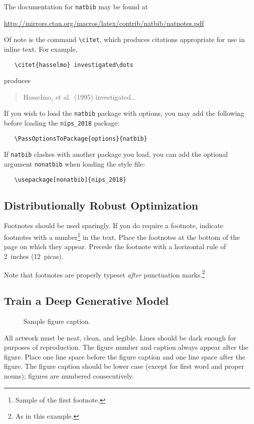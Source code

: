 \documentclass{article}
\begin{document}
The documentation for \verb+natbib+ may be found at
\begin{center}
  \url{http://mirrors.ctan.org/macros/latex/contrib/natbib/natnotes.pdf}
\end{center}
Of note is the command \verb+\citet+, which produces citations
appropriate for use in inline text.  For example,
\begin{verbatim}
   \citet{hasselmo} investigated\dots
\end{verbatim}
produces
\begin{quote}
  Hasselmo, et al.\ (1995) investigated\dots
\end{quote}

If you wish to load the \verb+natbib+ package with options, you may
add the following before loading the \verb+nips_2018+ package:
\begin{verbatim}
   \PassOptionsToPackage{options}{natbib}
\end{verbatim}

If \verb+natbib+ clashes with another package you load, you can add
the optional argument \verb+nonatbib+ when loading the style file:
\begin{verbatim}
   \usepackage[nonatbib]{nips_2018}
\end{verbatim}


\subsection{Distributionally Robust Optimization}

Footnotes should be used sparingly.  If you do require a footnote,
indicate footnotes with a number\footnote{Sample of the first
  footnote.} in the text. Place the footnotes at the bottom of the
page on which they appear.  Precede the footnote with a horizontal
rule of 2~inches (12~picas).

Note that footnotes are properly typeset \emph{after} punctuation
marks.\footnote{As in this example.}


\subsection{Train a Deep Generative Model}

\begin{figure}
  \centering
  \fbox{\rule[-.5cm]{0cm}{4cm} \rule[-.5cm]{4cm}{0cm}}
  \caption{Sample figure caption.}
\end{figure}

All artwork must be neat, clean, and legible. Lines should be dark
enough for purposes of reproduction. The figure number and caption
always appear after the figure. Place one line space before the figure
caption and one line space after the figure. The figure caption should
be lower case (except for first word and proper nouns); figures are
numbered consecutively.
\end{document}
